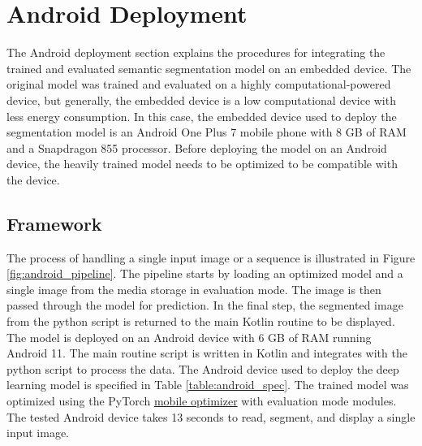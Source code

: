 

    \chapter{Android Deployment}
	\label{chap:androiddeploy}
	
	The Android deployment section explains the procedures for integrating the trained and evaluated semantic segmentation model on an embedded device. The original model was trained and evaluated on a highly computational-powered device, but generally, the embedded device is a low computational device with less energy consumption. In this case, the embedded device used to deploy the segmentation model is an Android One Plus 7 mobile phone with 8 GB of RAM and a Snapdragon 855 processor. Before deploying the model on an Android device, the heavily trained model needs to be optimized to be compatible with the device.    
	
    \section{Framework}
	
	The process of handling a single input image or a sequence is illustrated in Figure \ref{fig:android_pipeline}. The pipeline starts by loading an optimized model and a single image from the media storage in evaluation mode. The image is then passed through the model for prediction. In the final step, the segmented image from the python script is returned to the main Kotlin routine to be displayed. The model is deployed on an Android device with 6 GB of RAM running Android 11. The main routine script is written in Kotlin and integrates with the python script to process the data. The Android device used to deploy the deep learning model is specified in Table \ref{table:android_spec}. The trained model was optimized using the PyTorch \href{https://pytorch.org/docs/stable/mobile_optimizer.html}{\color{teal}mobile optimizer} with evaluation mode modules. The tested Android device takes 13 seconds to read, segment, and display a single input image.
	
